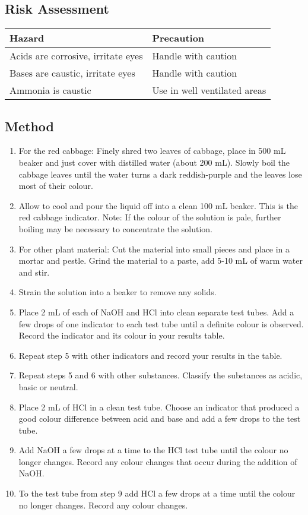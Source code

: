 	\subsection{Risk Assessment}
		\begin{table}[H]
			\centering
			\begin{tabular}{ll}
				\hline
				Hazard & Precaution \\ \hline
				Acids are corrosive, irritate eyes & Handle with caution \\
				Bases are caustic, irritate eyes & Handle with caution \\ \hline
				Ammonia is caustic & Use in well ventilated areas \\ \hline
			\end{tabular}
		\end{table}
	
	\subsection{Method}
		\begin{enumerate}
			\item For the red cabbage: Finely shred two leaves of cabbage, place in 500 mL beaker and just cover with distilled water (about 200 mL). Slowly boil the cabbage leaves until the water turns a dark reddish-purple and the leaves lose most of their colour.
			\item Allow to cool and pour the liquid off into a clean 100 mL beaker. This is the red cabbage indicator. Note: If the colour of the solution is pale, further boiling may be necessary to concentrate the solution.
			\item For other plant material: Cut the material into small pieces and place in a mortar and pestle. Grind the material to a paste, add 5-10 mL of warm water and stir.
			\item Strain the solution into a beaker to remove any solids.
			\item Place 2 mL of each of NaOH and HCl into clean separate test tubes. Add a few drops of one indicator to each test tube until a definite colour is observed. Record the indicator and its colour in your results table.
			\item Repeat step 5 with other indicators and record your results in the table. 
			\item Repeat steps 5 and 6 with other substances. Classify the substances as acidic, basic or neutral.
			\item Place 2 mL of HCl in a clean test tube. Choose an indicator that produced a good colour difference between acid and base and add a few drops to the test tube.
			\item Add NaOH a few drops at a time to the HCl test tube until the colour no longer changes. Record any colour changes that occur during the addition of NaOH.
			\item To the test tube from step 9 add HCl a few drops at a time until the colour no longer changes. Record any colour changes.
		\end{enumerate}

